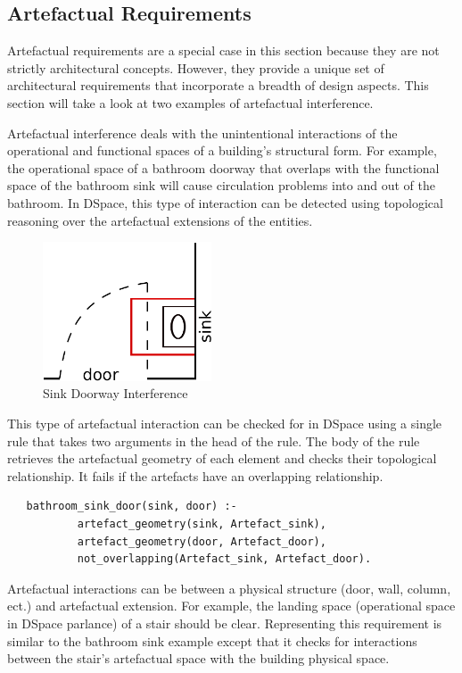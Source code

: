 \documentclass[12pt]{ucthesis}
\begin{document}
\subsection{Artefactual Requirements}
Artefactual requirements are a special case in this section because they are not strictly architectural concepts. However, they provide a unique set of architectural requirements that incorporate a breadth of design aspects. This section will take a look at two examples of artefactual interference. 

Artefactual interference deals with the unintentional interactions of the operational and functional spaces of a building's structural form. For example, the operational space of a bathroom doorway that overlaps with the functional space of the bathroom sink will cause circulation problems into and out of the bathroom. In DSpace, this type of interaction can be detected using topological reasoning over the artefactual extensions of the entities. 

\begin{figure}[H]
\centering
\includegraphics[width=50mm]{door-sink}
\caption{Sink Doorway Interference}
\label{door-sink-example}
\end{figure}

This type of artefactual interaction can be checked for in DSpace using a single rule that takes two arguments in the head of the rule. The body of the rule retrieves the artefactual geometry of each element and checks their topological relationship. It fails if the artefacts have an overlapping relationship.

\begin{verbatim}
   bathroom_sink_door(sink, door) :- 
           artefact_geometry(sink, Artefact_sink),
           artefact_geometry(door, Artefact_door),
           not_overlapping(Artefact_sink, Artefact_door).
\end{verbatim}

Artefactual interactions can be between a physical structure (door, wall, column, ect.) and artefactual extension. For example, the landing space (operational space in DSpace parlance) of a stair should be clear. Representing this requirement is similar to the bathroom sink example except that it checks for interactions between the stair's artefactual space with the building physical space.
\end{document}
